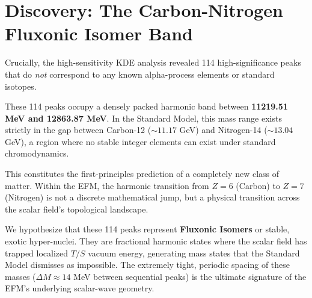 \documentclass[11pt, twoside]{article}
\begin{document}
\section{Discovery: The Carbon-Nitrogen Fluxonic Isomer Band}

Crucially, the high-sensitivity KDE analysis revealed 114 high-significance peaks that do \textit{not} correspond to any known alpha-process elements or standard isotopes. 

These 114 peaks occupy a densely packed harmonic band between \textbf{11219.51 MeV and 12863.87 MeV}. In the Standard Model, this mass range exists strictly in the gap between Carbon-12 ($\sim 11.17$ GeV) and Nitrogen-14 ($\sim 13.04$ GeV), a region where no stable integer elements can exist under standard chromodynamics.

\begin{table}[H]
\centering
\caption{The Carbon-Nitrogen Fluxonic Isomer Band (Subset of 114 New Resonances)}
\label{tab:isomers}
\end{table}

This constitutes the first-principles prediction of a completely new class of matter. Within the EFM, the harmonic transition from $Z=6$ (Carbon) to $Z=7$ (Nitrogen) is not a discrete mathematical jump, but a physical transition across the scalar field's topological landscape. 

We hypothesize that these 114 peaks represent \textbf{Fluxonic Isomers} or stable, exotic hyper-nuclei. They are fractional harmonic states where the scalar field has trapped localized $T/S$ vacuum energy, generating mass states that the Standard Model dismisses as impossible. The extremely tight, periodic spacing of these masses ($\Delta M \approx 14$ MeV between sequential peaks) is the ultimate signature of the EFM's underlying scalar-wave geometry. 
\end{document}
